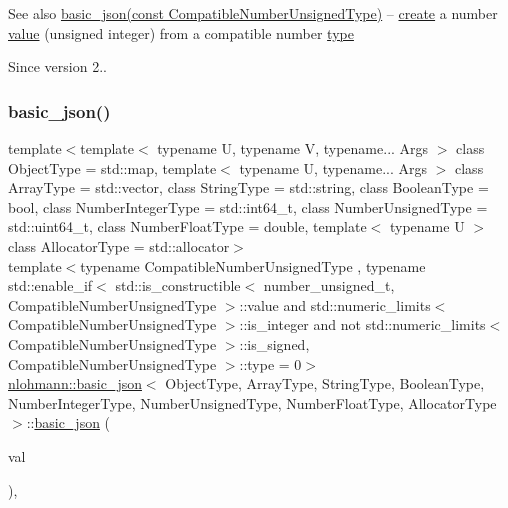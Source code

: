 \begin{DoxySeeAlso}{See also}
\hyperlink{classnlohmann_1_1basic__json_a68a5f34b164a07b8ced13fcf2b7ec834}{basic\+\_\+json(const Compatible\+Number\+Unsigned\+Type)} -- \hyperlink{classnlohmann_1_1basic__json_afdb7a485369fbfd8c4c7c134ebb1feb5}{create} a number \hyperlink{classnlohmann_1_1basic__json_a407e73a037e6e3067ef7aa2c25a79f39}{value} (unsigned integer) from a compatible number \hyperlink{classnlohmann_1_1basic__json_a5d466b240d0ba9f648d7fd4ff42359f5}{type}
\end{DoxySeeAlso}
\begin{DoxySince}{Since}
version 2.. 
\end{DoxySince}
\hypertarget{classnlohmann_1_1basic__json_a68a5f34b164a07b8ced13fcf2b7ec834}{}\label{classnlohmann_1_1basic__json_a68a5f34b164a07b8ced13fcf2b7ec834} 
\subsubsection{\texorpdfstring{basic\+\_\+json()}{basic\_json()}\hspace{0.1cm}{\footnotesize\ttfamily [15/23]}}
{\footnotesize\ttfamily template$<$template$<$ typename U, typename V, typename... Args $>$ class Object\+Type = std\+::map, template$<$ typename U, typename... Args $>$ class Array\+Type = std\+::vector, class String\+Type  = std\+::string, class Boolean\+Type  = bool, class Number\+Integer\+Type  = std\+::int64\+\_\+t, class Number\+Unsigned\+Type  = std\+::uint64\+\_\+t, class Number\+Float\+Type  = double, template$<$ typename U $>$ class Allocator\+Type = std\+::allocator$>$ \\
template$<$typename Compatible\+Number\+Unsigned\+Type , typename std\+::enable\+\_\+if$<$ std\+::is\+\_\+constructible$<$ number\+\_\+unsigned\+\_\+t, Compatible\+Number\+Unsigned\+Type $>$\+::value and std\+::numeric\+\_\+limits$<$ Compatible\+Number\+Unsigned\+Type $>$\+::is\+\_\+integer and not std\+::numeric\+\_\+limits$<$ Compatible\+Number\+Unsigned\+Type $>$\+::is\+\_\+signed, Compatible\+Number\+Unsigned\+Type $>$\+::type  = 0$>$ \\
\hyperlink{classnlohmann_1_1basic__json}{nlohmann\+::basic\+\_\+json}$<$ Object\+Type, Array\+Type, String\+Type, Boolean\+Type, Number\+Integer\+Type, Number\+Unsigned\+Type, Number\+Float\+Type, Allocator\+Type $>$\+::\hyperlink{classnlohmann_1_1basic__json}{basic\+\_\+json} (\begin{DoxyParamCaption}\item[{const Compatible\+Number\+Unsigned\+Type}]{val }\end{DoxyParamCaption})\hspace{0.3cm}{\ttfamily [inline]}, {\ttfamily [noexcept]}}



